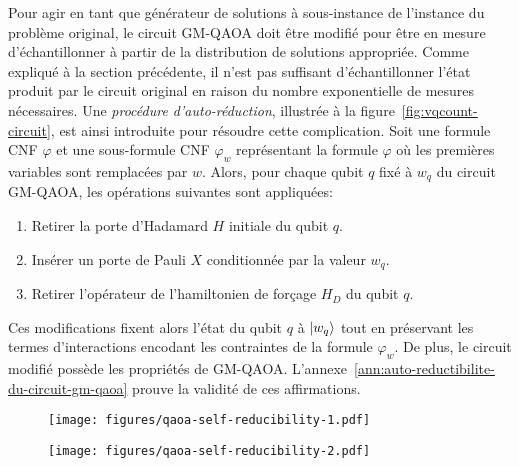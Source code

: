 Pour agir en tant que générateur de solutions à sous-instance de l'instance du problème original, le circuit GM-QAOA doit être modifié pour être en mesure d'échantillonner à partir de la distribution de solutions appropriée. Comme expliqué à la section précédente, il n'est pas suffisant d'échantillonner l'état produit par le circuit original en raison du nombre exponentielle de mesures nécessaires. Une \textit{procédure d'auto-réduction}, illustrée à la figure~\ref{fig:vqcount-circuit}, est ainsi introduite pour résoudre cette complication. Soit une formule CNF $\varphi$ et une sous-formule CNF $\varphi_{w}$ représentant la formule $\varphi$ où les premières variables sont remplacées par $w$. Alors, pour chaque qubit $q$ fixé à $w_{q}$ du circuit GM-QAOA, les opérations suivantes sont appliquées:

\begin{enumerate}[(1)]
    \item Retirer la porte d'Hadamard $H$ initiale du qubit $q$.
    \item Insérer un porte de Pauli $X$ conditionnée par la valeur $w_{q}$.
    \item Retirer l'opérateur de l'hamiltonien de forçage $H_{D}$ du qubit $q$.
\end{enumerate}

Ces modifications fixent alors l'état du qubit $q$ à $\ket{w_{q}}$ tout en préservant les termes d'interactions encodant les contraintes de la formule $\varphi_{w}$. De plus, le circuit modifié possède les propriétés de GM-QAOA. L'annexe~\ref{ann:auto-reductibilite-du-circuit-gm-qaoa} prouve la validité de ces affirmations.

\begin{figure*}[h!]
    \centering
    \begin{subfigure}[h]{0.6\textwidth}
    \centering
    \caption{}
    \texttt{[image: figures/qaoa-self-reducibility-1.pdf]}
    \label{fig:vqcount-circuit-a}
    \end{subfigure}
    \begin{subfigure}[h]{0.6\textwidth}
    \centering
    \caption{}
    \texttt{[image: figures/qaoa-self-reducibility-2.pdf]}
    \label{fig:vqcount-circuit-b}
    \end{subfigure}
\caption[Procédure d'auto-réduction de VQCount]{Générateur de solutions QAOA avant (a) et après (b) avoir fixé le premier qubit à $c$ durant la procédure d'auto-réduction.}
\label{fig:vqcount-circuit}
\end{figure*}

